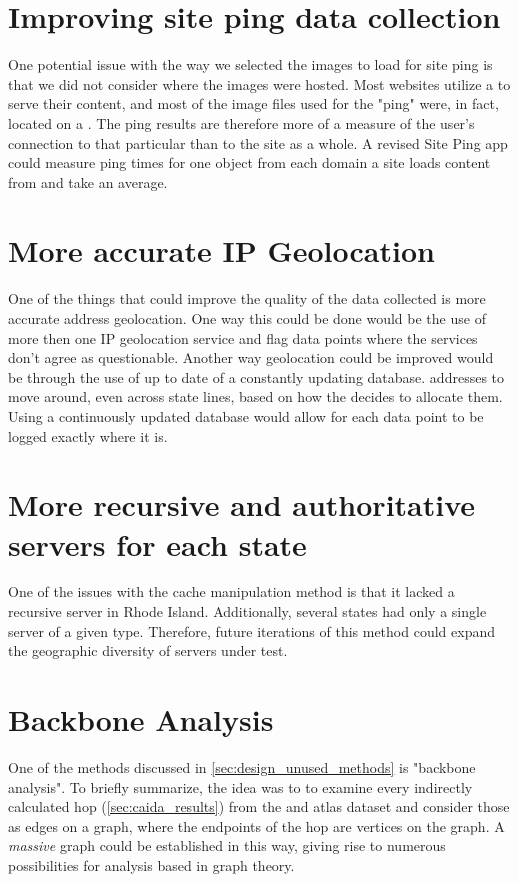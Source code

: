 \section{Improving site ping data collection}

One potential issue with the way we selected the images to load for site ping is that we did not consider where the images were hosted. Most websites utilize a \cdn to serve their content, and most of the image files used for the "ping" were, in fact, located on a \cdn. The ping results are therefore more of a measure of the user's connection to that particular \cdn than to the site as a whole. A revised Site Ping app could measure ping times for one object from each domain a site loads content from and take an average.

\section{More accurate IP Geolocation}

One of the things that could improve the quality of the data collected is more accurate \ip address geolocation. One way this could be done would be the use of more then one IP geolocation service and flag data points where the services don't agree as questionable. Another way geolocation could be improved would be through the use of up to date of a constantly updating database. \ip addresses to move around, even across state lines, based on how the \isp decides to allocate them. Using a continuously updated database would allow for each data point to be logged exactly where it is.

\section{More recursive and authoritative servers for each state}

One of the issues with the \dns cache manipulation method is that it lacked a recursive \dns server in Rhode Island. Additionally, several states had only a single server of a given type. Therefore, future iterations of this method could expand the geographic diversity of servers under test.

\section{Backbone Analysis}

One of the methods discussed in \cref{sec:design_unused_methods} is "backbone analysis". To briefly summarize, the idea was to to examine every indirectly calculated hop (\cref{sec:caida_results}) from the \caida and \ripe atlas dataset and consider those as edges on a graph, where the endpoints of the hop are vertices on the graph. A \textit{massive} graph could be established in this way, giving rise to numerous possibilities for analysis based in graph theory.

